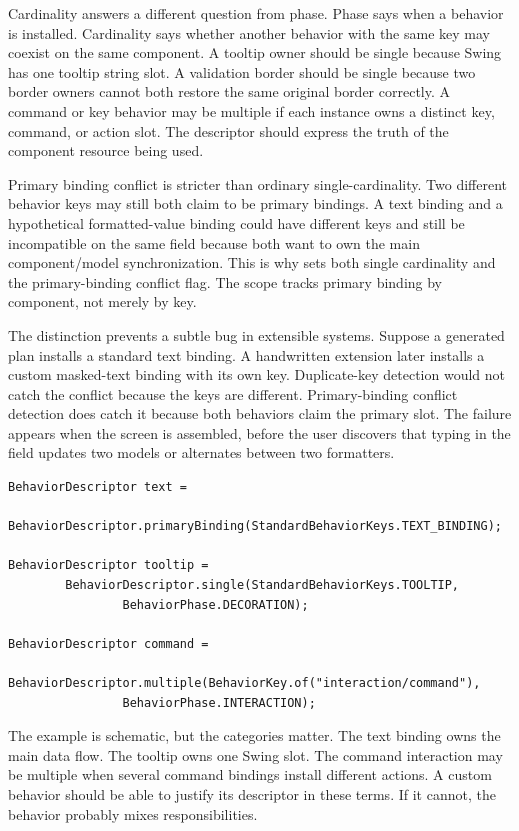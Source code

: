 Cardinality answers a different question from phase. Phase says when a behavior
is installed. Cardinality says whether another behavior with the same key may
coexist on the same component. A tooltip owner should be single because Swing
has one tooltip string slot. A validation border should be single because two
border owners cannot both restore the same original border correctly. A command
or key behavior may be multiple if each instance owns a distinct key, command,
or action slot. The descriptor should express the truth of the component
resource being used.

Primary binding conflict is stricter than ordinary single-cardinality. Two
different behavior keys may still both claim to be primary bindings. A text
binding and a hypothetical formatted-value binding could have different keys
and still be incompatible on the same field because both want to own the main
component/model synchronization. This is why 
sets both single cardinality and the primary-binding conflict flag. The scope
tracks primary binding by component, not merely by key.

The distinction prevents a subtle bug in extensible systems. Suppose a generated
plan installs a standard text binding. A handwritten extension later installs a
custom masked-text binding with its own key. Duplicate-key detection would not
catch the conflict because the keys are different. Primary-binding conflict
detection does catch it because both behaviors claim the primary slot. The
failure appears when the screen is assembled, before the user discovers that
typing in the field updates two models or alternates between two formatters.

\begin{lstlisting}[caption={Descriptor choices encode component responsibility.}]
BehaviorDescriptor text =
        BehaviorDescriptor.primaryBinding(StandardBehaviorKeys.TEXT_BINDING);

BehaviorDescriptor tooltip =
        BehaviorDescriptor.single(StandardBehaviorKeys.TOOLTIP,
                BehaviorPhase.DECORATION);

BehaviorDescriptor command =
        BehaviorDescriptor.multiple(BehaviorKey.of("interaction/command"),
                BehaviorPhase.INTERACTION);
\end{lstlisting}

The example is schematic, but the categories matter. The text binding owns the
main data flow. The tooltip owns one Swing slot. The command interaction may be
multiple when several command bindings install different actions. A custom
behavior should be able to justify its descriptor in these terms. If it cannot,
the behavior probably mixes responsibilities.

